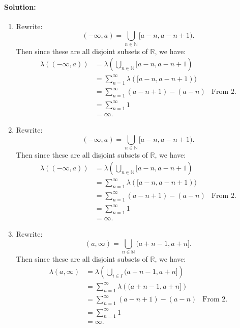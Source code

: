 \documentclass{article}
\begin{document}
\begin{enumerate}
        \paragraph{Solution: }
        \begin{enumerate}
            \item 
    Rewrite:
        \[
            (-\infty,a)=\bigcup_{n\in \mathbb{N}} [a-n,a-n+1)
        .\] 
        Then since these are all disjoint subsets of $\mathbb{R}$, we have:
        \begin{align*}
            \lambda\left( (-\infty,a) \right) &= \lambda(\bigcup_{n\in \mathbb{N}} [a-n,a-n+1) \\
            &= \sum_{n=1}^{\infty} \lambda([a-n,a-n+1)) \\
            &= \sum_{n=1}^{\infty}(a-n+1)-(a-n)&\text{From 2.}\\
            &= \sum_{n=1}^{\infty}1\\
            &=\infty
        .\end{align*}
    \item Rewrite:
        \[
            (-\infty,a)=\bigcup_{n\in \mathbb{N}} [a-n,a-n+1)
        .\] 
        Then since these are all disjoint subsets of $\mathbb{R}$, we have:
        \begin{align*}
            \lambda\left( (-\infty,a) \right) &= \lambda(\bigcup_{n\in \mathbb{N}} [a-n,a-n+1) \\
            &= \sum_{n=1}^{\infty} \lambda([a-n,a-n+1)) \\
            &= \sum_{n=1}^{\infty}(a-n+1)-(a-n)&\text{From 2.}\\
            &= \sum_{n=1}^{\infty}1\\
            &=\infty
        .\end{align*}

        \newpage
            \item 
    Rewrite:
    \[
        (a,\infty)=\bigcup_{n\in \mathbb{N}} (a+n-1,a+n]
    .\] 
    Then since these are all disjoint subsets of $\mathbb{R}$, we have:
    \begin{align*}
        \lambda\left( a,\infty \right) &= \lambda\left( \bigcup_{i \in  I} (a+n-1,a+n] \right)  \\
                                       &= \sum_{n=1}^{\infty} \lambda\left(  (a+n-1,a+n] \right)  \\
                                       &= \sum_{n=1}^{\infty} (a-n+1)-(a-n) &\text{From 2.}\\
                                       &= \sum_{n=1}^{\infty} 1 \\
                                       &= \infty 
    .\end{align*}


\end{enumerate}
\end{enumerate}
\end{document}
